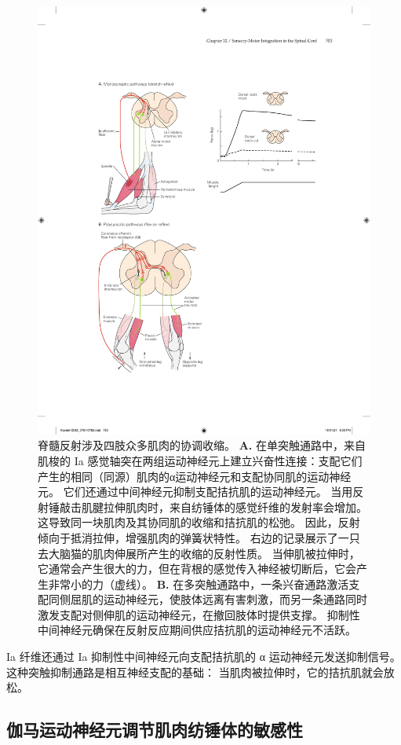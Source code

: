 \begin{figure}[htbp]
	\centering
	\includegraphics[width=0.75\linewidth]{chap32/fig_32_1}
	\caption{脊髓反射涉及四肢众多肌肉的协调收缩。
		\textbf{A.} 在单突触通路中，来自肌梭的 Ia 感觉轴突在两组运动神经元上建立兴奋性连接：支配它们产生的相同（同源）肌肉的α运动神经元和支配协同肌的运动神经元。 
		它们还通过中间神经元抑制支配拮抗肌的运动神经元。
		当用反射锤敲击肌腱拉伸肌肉时，来自纺锤体的感觉纤维的发射率会增加。
		这导致同一块肌肉及其协同肌的收缩和拮抗肌的松弛。
		因此，反射倾向于抵消拉伸，增强肌肉的弹簧状特性。
		右边的记录展示了一只去大脑猫的肌肉伸展所产生的收缩的反射性质。 当伸肌被拉伸时，它通常会产生很大的力，但在背根的感觉传入神经被切断后，它会产生非常小的力（虚线）\cite{liddell1924reflexes}。
		\textbf{B.} 在多突触通路中，一条兴奋通路激活支配同侧屈肌的运动神经元，使肢体远离有害刺激，而另一条通路同时激发支配对侧伸肌的运动神经元，在撤回肢体时提供支撑。
		抑制性中间神经元确保在反射反应期间供应拮抗肌的运动神经元不活跃\cite{schmidt1989motor}。}
	\label{fig:32_1}
\end{figure}


Ia 纤维还通过 Ia 抑制性中间神经元向支配拮抗肌的 α 运动神经元发送抑制信号。
这种突触抑制通路是相互神经支配的基础：
当肌肉被拉伸时，它的拮抗肌就会放松。



\subsection{伽马运动神经元调节肌肉纺锤体的敏感性}

